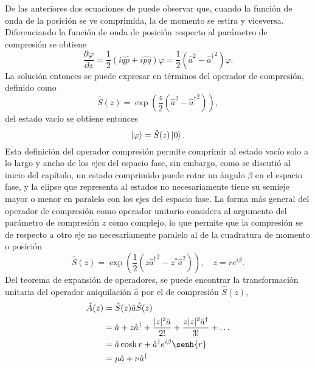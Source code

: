 De las anteriores dos ecuaciones de puede observar que, cuando la función de onda de la posición se ve comprimida, la de momento se estira y viceversa. Diferenciando la función de onda de posición respecto al parámetro de compresión se obtiene \cite{Leonhardt}
\begin{equation}
  \frac{\partial \varphi}{\partial z} = \frac{1}{2}\left( i\hat{q}\hat{p} + i\hat{p}\hat{q} \right)\varphi = \frac{1}{2}\left( {\hat{a}}^2 - {\hat{a}^{\dagger}}^2 \right)\varphi.
\end{equation}
La solución entonces se puede expresar en términos del operador de compresión, definido como
\begin{equation}
  \hat{S}(z) = \exp{\left( \frac{z}{2}(\hat{a}^2 - {\hat{a}^{\dagger}}^2) \right)},
\end{equation}
del estado vacío se obtiene entonces
\begin{equation}
  \ket{\varphi} = \hat{S}(z)\ket{0}.
\end{equation}
Esta definición del operador compresión permite comprimir al estado vacío solo a lo largo y ancho de los ejes del espacio fase, sin embargo, como se discutió al inicio del capítulo, un estado comprimido puede rotar un ángulo $\beta$ en el espacio fase, y la elipse que representa al estados no necesariamente tiene su semieje mayor o menor en paralelo con los ejes del espacio fase. La forma más general del operador de compresión como operador unitario considera al argumento del parámetro de compresión $z$ como complejo, lo que permite que la compresión se de respecto a otro eje no necesariamente paralelo al de la cuadratura de momento o posición \cite{Loudon}
\begin{equation}
  \hat{S}(z) = \exp{\left( \frac{1}{2} (z{\hat{a}^{\dagger}}^2 - z^* {\hat{a}}^2) \right)}, \quad z = re^{i\beta}.
\end{equation}
Del teorema de expansión de operadores, se puede encontrar la transformación unitaria del operador aniquilación $\hat{a}$ por el de compresión $\hat{S}(z)$,
\begin{align}
  \hat{A}(z) & = \hat{S}(z)\hat{a} \hat{S}(z)                                                                       \nonumber \\
             & = \hat{a}  + z\hat{a}^{\dagger} + \frac{|z|^2\hat{a}}{2!} + \frac{z|z|^2\hat{a}^{\dagger}}{3!}+\dots \nonumber \\
             & = \hat{a} \cosh{r} + \hat{a}^{\dagger} e^{i\beta}\senh{r}                                            \nonumber \\
             & = \mu\hat{a} + \nu\hat{a}^{\dagger}
\end{align}
